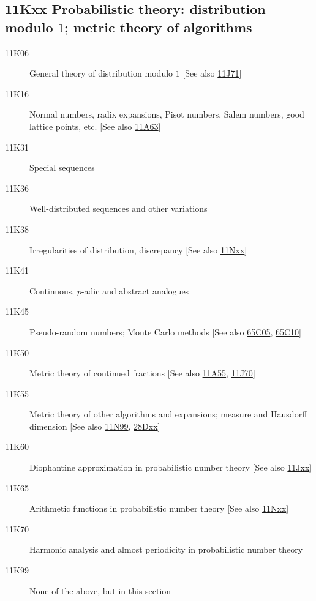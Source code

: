 \subsection*{11Kxx  Probabilistic theory: distribution modulo $1$; metric theory of algorithms }\label{11Kxx}
\begin{description}  
\item [11K06]\label{11K06} General theory of distribution modulo $1$ [See also \hyperref[11J71]{11J71}]
\item [11K16]\label{11K16} Normal numbers, radix expansions, Pisot numbers, Salem numbers, good lattice points, etc. [See also \hyperref[11A63]{11A63}]
\item [11K31]\label{11K31} Special sequences
\item [11K36]\label{11K36} Well-distributed sequences and other variations
\item [11K38]\label{11K38} Irregularities of distribution, discrepancy [See also \hyperref[11Nxx]{11Nxx}]
\item [11K41]\label{11K41} Continuous, $p$-adic and abstract analogues
\item [11K45]\label{11K45} Pseudo-random numbers; Monte Carlo methods [See also \hyperref[65C05]{65C05}, \hyperref[65C10]{65C10}]
\item [11K50]\label{11K50} Metric theory of continued fractions [See also \hyperref[11A55]{11A55}, \hyperref[11J70]{11J70}]
\item [11K55]\label{11K55} Metric theory of other algorithms and expansions; measure and Hausdorff dimension [See also \hyperref[11N99]{11N99}, \hyperref[28Dxx]{28Dxx}]
\item [11K60]\label{11K60} Diophantine approximation in probabilistic number theory [See also \hyperref[11Jxx]{11Jxx}]
\item [11K65]\label{11K65} Arithmetic functions in probabilistic number theory [See also \hyperref[11Nxx]{11Nxx}]
\item [11K70]\label{11K70} Harmonic analysis and almost periodicity in probabilistic number theory
\item [11K99]\label{11K99} None of the above, but in this section
\end{description}
